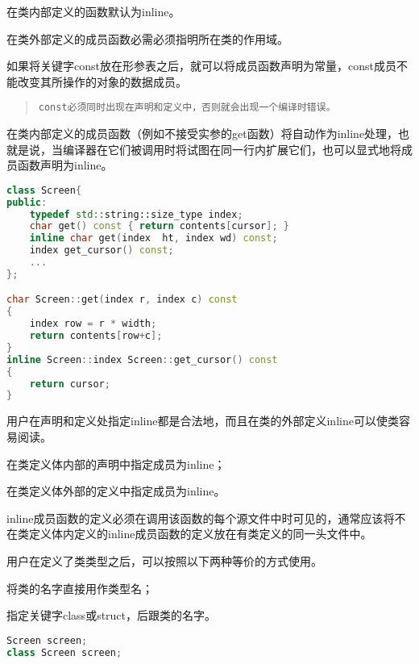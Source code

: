 \begin{compactitem}
\item 在类内部定义的函数默认为inline。
\item 在类外部定义的成员函数必需必须指明所在类的作用域。
\end{compactitem}



如果将关键字const放在形参表之后，就可以将成员函数声明为常量，const成员不能改变其所操作的对象的数据成员。

\begin{quote}
\texttt{const必须同时出现在声明和定义中，否则就会出现一个编译时错误。}
\end{quote}

在类内部定义的成员函数（例如不接受实参的get函数）将自动作为inline处理，也就是说，当编译器在它们被调用时将试图在同一行内扩展它们，也可以显式地将成员函数声明为inline。

\begin{lstlisting}[language=C++]
class Screen{
public:
	typedef std::string::size_type index;
	char get() const { return contents[cursor]; }
	inline char get(index  ht, index wd) const;
	index get_cursor() const;
	...
};

char Screen::get(index r, index c) const
{
	index row = r * width;
	return contents[row+c];
}
inline Screen::index Screen::get_cursor() const
{
	return cursor;
}
\end{lstlisting}

用户在声明和定义处指定inline都是合法地，而且在类的外部定义inline可以使类容易阅读。

\begin{compactitem}
\item 在类定义体内部的声明中指定成员为inline；
\item 在类定义体外部的定义中指定成员为inline。
\end{compactitem}

inline成员函数的定义必须在调用该函数的每个源文件中时可见的，通常应该将不在类定义体内定义的inline成员函数的定义放在有类定义的同一头文件中。

用户在定义了类类型之后，可以按照以下两种等价的方式使用。

\begin{compactitem}
\item 将类的名字直接用作类型名；
\item 指定关键字class或struct，后跟类的名字。
\end{compactitem}

\begin{lstlisting}[language=C++]
Screen screen;
class Screen screen;
\end{lstlisting}



